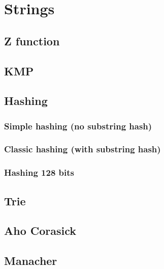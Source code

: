 \newpage
\section{Strings}

\subsection{Z function}


\subsection{KMP}


\subsection{Hashing}

\subsubsection{Simple hashing (no substring hash)}


\subsubsection{Classic hashing (with substring hash)}


\subsubsection{Hashing 128 bits}


\subsection{Trie}


\subsection{Aho Corasick}


\subsection{Manacher}


